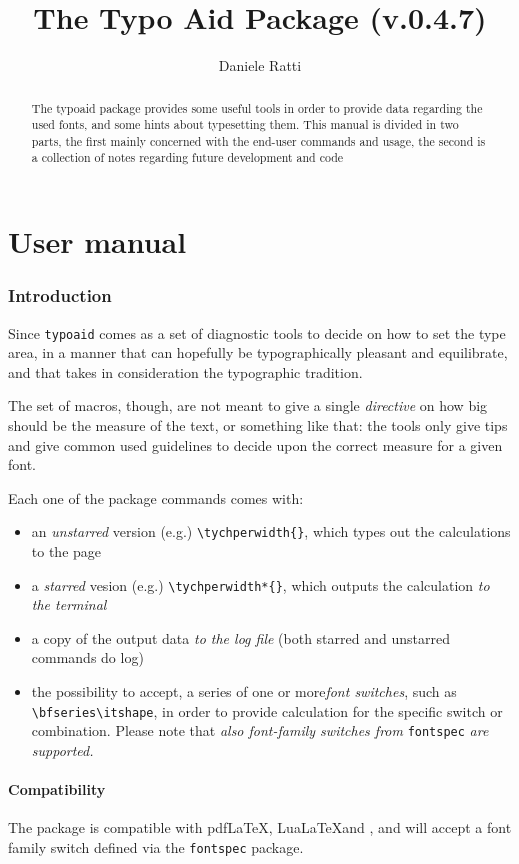 \documentclass{article}
\author{Daniele Ratti}
\title{The Typo Aid Package (v.0.4.7)}
\begin{document}
\maketitle

\begin{abstract}
The typoaid package provides some useful tools in order to provide data regarding the used fonts, and some hints about typesetting them. This manual is divided in two parts, the first mainly concerned with the end-user commands and usage, the second is a collection of notes regarding future development and code
\end{abstract}
\tableofcontents
\part{User manual}
\section{Introduction}
Since \texttt{typoaid} comes as a set of diagnostic tools to decide on how to set the type area,  in a manner that can hopefully be typographically pleasant and equilibrate, and that takes in consideration the typographic tradition.

The set of macros, though, are not meant to give a single \emph{directive} on how big should be the measure of the text, or something like that: the tools only give tips and give common used guidelines to decide upon the correct measure for a given font.

Each one of the package commands comes with:
\begin{itemize}
\item an \emph{unstarred} version (e.g.)  \verb|\tychperwidth{}|, which types out the calculations to the page
\item a \emph{starred} vesion (e.g.) \verb!\tychperwidth*{}!, which outputs the calculation \emph{to the terminal}
\item a copy of the output data \emph{to the log file} (both starred and unstarred commands do log)
\item the possibility to accept, a series of  one or more\emph{font switches}, such as \verb|\bfseries\itshape|, in order to provide calculation for the specific switch or combination. Please note that \emph{also font-family switches from} \texttt{fontspec} \emph{are supported.}
\end{itemize}
\subsection{Compatibility}
The package is compatible with pdf{}\LaTeX, Lua\LaTeX and \XeLaTeX, and will accept a font family switch defined via the \texttt{fontspec} package.
\end{document}
